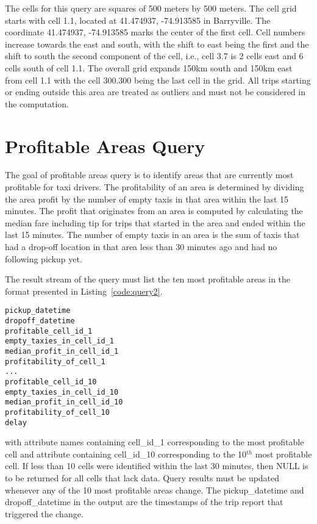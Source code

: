 \documentclass{sig-alternate}
\begin{document}
The cells for this query are squares of 500 meters by 500 meters. The cell grid starts with cell 1.1, located at 41.474937, -74.913585 in Barryville. The coordinate 41.474937, -74.913585 marks the center of the first cell. Cell numbers increase towards the east and south, with the shift to east being the first and the shift to south the second component of the cell, i.e., cell 3.7 is 2 cells east and 6 cells south of cell 1.1. The overall grid expands 150km south and 150km east from cell 1.1 with the cell 300.300 being the last cell in the grid. All trips starting or ending outside this area are treated as outliers and must not be considered in the computation.
\section{Profitable Areas Query}
The goal of profitable areas query is to identify areas that are currently most profitable for taxi drivers. The profitability of an area is determined by dividing the area profit by the number of empty taxis in that area within the last 15 minutes. The profit that originates from an area is computed by calculating the median fare including tip for trips that started in the area and ended within the last 15 minutes. The number of empty taxis in an area is the sum of taxis that had a drop-off location in that area less than 30 minutes ago and had no following pickup yet.

The result stream of the query must list the ten most profitable areas in the format presented in Listing~\ref{code:query2}.

\begin{lstlisting}[float=ht,caption={Output format for the profitable areas query},label={code:query2}]
pickup_datetime
dropoff_datetime
profitable_cell_id_1
empty_taxies_in_cell_id_1
median_profit_in_cell_id_1
profitability_of_cell_1
... 
profitable_cell_id_10
empty_taxies_in_cell_id_10
median_profit_in_cell_id_10
profitability_of_cell_10
delay
\end{lstlisting}

with attribute names containing cell\_id\_1 corresponding to the most profitable cell and attribute containing cell\_id\_10 corresponding to the 10$^{th}$ most profitable cell. If less than 10 cells were identified within the last 30 minutes, then NULL is to be returned for all cells that lack data. Query results must be updated whenever any of the 10 most profitable areas change. The pickup\_datetime and dropoff\_datetime in the output are the timestamps of the trip report that triggered the change.
\end{document}
